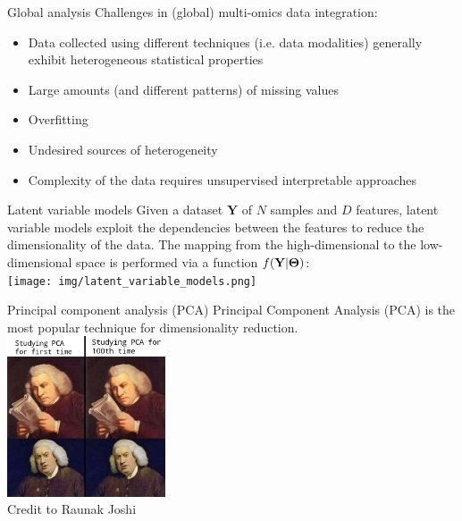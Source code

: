\documentclass[aspectratio=169,notes]{beamer}
\begin{document}
	\begin{frame}{Global analysis}
	Challenges in (global) multi-omics data integration:
	\begin{itemize}
		\item Data collected using different techniques (i.e. data modalities) generally exhibit heterogeneous statistical properties
		\item Large amounts (and different patterns) of missing values
		\item Overfitting
		\item Undesired sources of heterogeneity
		\item Complexity of the data requires unsupervised interpretable approaches
	\end{itemize}
	\end{frame}

	\begin{frame}{Latent variable models}
	Given a dataset $\mathbf{Y}$ of $N$ samples and $D$ features, latent variable models exploit the dependencies between the features to reduce the dimensionality of the data. The mapping from the high-dimensional to the low-dimensional space is performed via a function $f({\bf Y}|\mbox{\boldmath $\Theta$})$:\\
	\leavevmode\newline
	\centering
	\texttt{[image: img/latent\_variable\_models.png]}
	\end{frame}

	\begin{frame}{Principal component analysis (PCA)}
	Principal Component Analysis (PCA) is the most popular technique for dimensionality reduction.\\
	\leavevmode\newline
	\centering
	\includegraphics[height=4.75cm]{img/pca.jpeg}\\
  	\tiny Credit to Raunak Joshi \par
	\end{frame}
\end{document}
